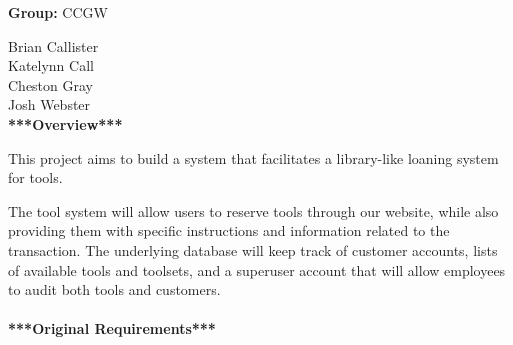 \documentclass[12pt,letterpaper]{article}
\newcommand\name{
Brian Callister\\
Katelynn Call\\
Cheston Gray\\
Josh Webster
}
\begin{document}
\textbf{Group: } CCGW

\name\\
    
\textbf{***Overview***}

This project aims to build a system that facilitates a library-like loaning system for tools.

The tool system will allow users to reserve tools through our website, while also providing them with specific instructions and information related to the transaction.  The underlying database will keep track of customer accounts, lists of available tools and toolsets, and a superuser account that will allow employees to audit both tools and customers.\\\\

\textbf{***Original Requirements***}
\end{document}
